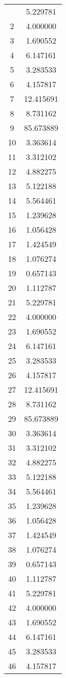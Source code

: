 \documentclass[12pt]{article}
\begin{document}
\begin{longtable}{@{}cc@{}}
\bottomrule
\endlastfoot
1 & 5.229781 \\
2 & 4.000000 \\
3 & 1.690552 \\
4 & 6.147161 \\
5 & 3.283533 \\
6 & 4.157817 \\
7 & 12.415691 \\
8 & 8.731162 \\
9 & 85.673889 \\
10 & 3.363614 \\
11 & 3.312102 \\
12 & 4.882275 \\
13 & 5.122188 \\
14 & 5.564461 \\
15 & 1.239628 \\
16 & 1.056428 \\
17 & 1.424549 \\
18 & 1.076274 \\
19 & 0.657143 \\
20 & 1.112787 \\
21 & 5.229781 \\
22 & 4.000000 \\
23 & 1.690552 \\
24 & 6.147161 \\
25 & 3.283533 \\
26 & 4.157817 \\
27 & 12.415691 \\
28 & 8.731162 \\
29 & 85.673889 \\
30 & 3.363614 \\
31 & 3.312102 \\
32 & 4.882275 \\
33 & 5.122188 \\
34 & 5.564461 \\
35 & 1.239628 \\
36 & 1.056428 \\
37 & 1.424549 \\
38 & 1.076274 \\
39 & 0.657143 \\
40 & 1.112787 \\
41 & 5.229781 \\
42 & 4.000000 \\
43 & 1.690552 \\
44 & 6.147161 \\
45 & 3.283533 \\
46 & 4.157817 \\

\end{longtable}
\end{document}
